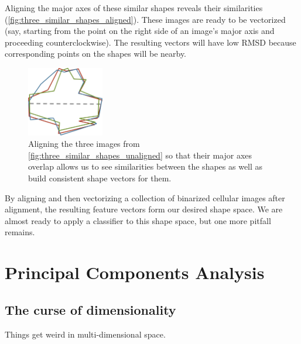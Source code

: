 Aligning the major axes of these similar shapes reveals their similarities (\autoref{fig:three_similar_shapes_aligned}). These images are ready to be vectorized (say, starting from the point on the right side of an image's major axis and proceeding counterclockwise). The resulting vectors will have low RMSD because corresponding points on the shapes will be nearby.\\

\begin{figure}[h]
\centering
\mySfFamily
\includegraphics[width = 0.3\textwidth]{../images/three_similar_shapes_aligned.png}
\caption{Aligning the three images from \autoref{fig:three_similar_shapes_unaligned} so that their major axes overlap allows us to see similarities between the shapes as well as build consistent shape vectors for them.}
\label{fig:three_similar_shapes_aligned}
\end{figure}

\begin{note}\end{note}

By aligning and then vectorizing a collection of binarized cellular images after alignment, the resulting feature vectors form our desired shape space. We are almost ready to apply a classifier to this shape space, but one more pitfall remains.\\


\FloatBarrier
{}

\section{Principal Components Analysis}
\label{sec:pca}

\subsection{The curse of dimensionality}

Things get weird in multi-dimensional space.


